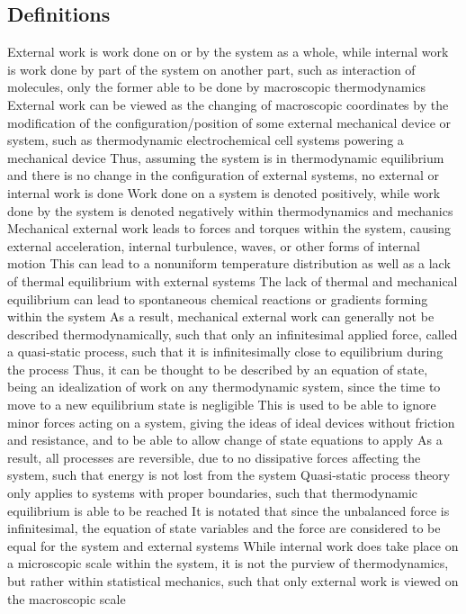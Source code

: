 \subsection{Definitions}
\begin{outline*}
\1 External work is work done on or by the system as a whole, while internal work is work done by part of the system on another part, such as interaction of molecules, only the former able to be done by macroscopic thermodynamics
\2 External work can be viewed as the changing of macroscopic coordinates by the modification of the configuration/position of some external mechanical device or system, such as thermodynamic electrochemical cell systems powering a mechanical device
\3 Thus, assuming the system is in thermodynamic equilibrium and there is no change in the configuration of external systems, no external or internal work is done
\2 Work done on a system is denoted positively, while work done by the system is denoted negatively within thermodynamics and mechanics
\1 Mechanical external work leads to forces and torques within the system, causing external acceleration, internal turbulence, waves, or other forms of internal motion
\2 This can lead to a nonuniform temperature distribution as well as a lack of thermal equilibrium with external systems
\3 The lack of thermal and mechanical equilibrium can lead to spontaneous chemical reactions or gradients forming within the system
\2 As a result, mechanical external work can generally not be described thermodynamically, such that only an infinitesimal applied force, called a quasi-static process, such that it is infinitesimally close to equilibrium during the process
\3 Thus, it can be thought to be described by an equation of state, being an idealization of work on any thermodynamic system, since the time to move to a new equilibrium state is negligible
\3 This is used to be able to ignore minor forces acting on a system, giving the ideas of ideal devices without friction and resistance, and to be able to allow change of state equations to apply
\3 As a result, all processes are reversible, due to no dissipative forces affecting the system, such that energy is not lost from the system
\2 Quasi-static process theory only applies to systems with proper boundaries, such that thermodynamic equilibrium is able to be reached
\2 It is notated that since the unbalanced force is infinitesimal, the equation of state variables and the force are considered to be equal for the system and external systems
\1 While internal work does take place on a microscopic scale within the system, it is not the purview of thermodynamics, but rather within statistical mechanics, such that only external work is viewed on the macroscopic scale
\end{outline*}
